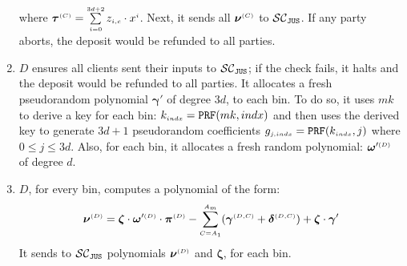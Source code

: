 \begin{enumerate}
where $\bm\tau^{\scriptscriptstyle  {  {(C)}}}=\sum\limits^{\scriptscriptstyle 3d+2}_{\scriptscriptstyle i=0}z_{\scriptscriptstyle i,c}\cdot x^{\scriptscriptstyle i}$. Next, it sends  all $\bm\nu^{\scriptscriptstyle  {  {(C)}} }$ to $\mathcal{SC}_{\mathtt{JUS}}$. If any party aborts, the deposit would be refunded to all parties.










\item\label{f-psi::D-gen-random-poly} ${D}$ ensures all clients sent their inputs to $\mathcal{SC}_{\mathtt{JUS}}$; if the check fails, it halts and the deposit would be refunded to all parties. It allocates a fresh pseudorandom polynomial $\bm\gamma'$ of degree $3d$, to each bin. To do so, it uses $mk$ to derive a key for each bin: $k_{\scriptscriptstyle  { {indx}}}=\mathtt{PRF}(mk, {    {   {indx}}})$ and then uses the derived key to generate $3d+1$ pseudorandom coefficients $g_{\scriptscriptstyle  { {j,indx}}}=\mathtt{PRF}(k_{\scriptscriptstyle  { {indx}}}, j)$ where $ 0\leq j \leq 3d$. Also, for each bin,  it allocates a fresh random polynomial:  $\bm\omega'^{\scriptscriptstyle  {  {(D)}}}$ of degree $d$. 

\item\label{f-psi::D-gen-switching-poly}  $ {D}$,  for every bin, computes a polynomial of the form:  
$$\bm\nu^{\scriptscriptstyle  {  {(D)}}}=\bm\zeta \cdot  \bm\omega'^{\scriptscriptstyle  {  {(D)}}}\cdot \bm\pi^{\scriptscriptstyle  {  {(D)}} }-\sum\limits^{\scriptscriptstyle  {   A}_{\scriptscriptstyle  {   m}}}_{\scriptscriptstyle   {  {C }= }   {   A}_{\scriptscriptstyle  {  1}}}(\bm\gamma^{\scriptscriptstyle  {  {(D,C)}}} + \bm\delta^{\scriptscriptstyle  {  {(D,C)}}}) + \bm\zeta \cdot \bm\gamma'$$ 
It sends to $\mathcal{SC}_{\mathtt{JUS}}$  polynomials $\bm\nu^{\scriptscriptstyle  {  {(D)}}}$ and $\bm\zeta$, for each bin.


\end{enumerate}
